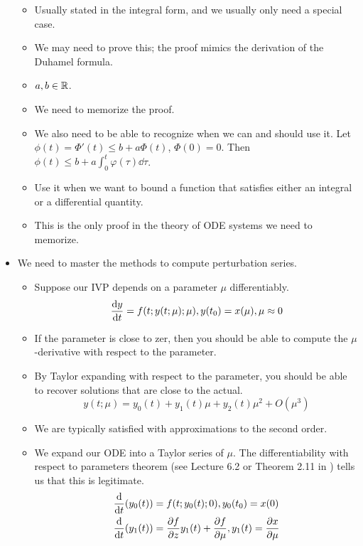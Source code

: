\documentclass[../notes.tex]{subfiles}
\begin{document}
\begin{itemize}
\begin{itemize}
        \item Usually stated in the integral form, and we usually only need a special case.
        \item We may need to prove this; the proof mimics the derivation of the Duhamel formula.
        \item $a,b\in\mathbb{R}$.
        \item We need to memorize the proof.
        \item We also need to be able to recognize when we can and should use it. Let $\phi(t)=\Phi'(t)\leq b+a\Phi(t)$, $\Phi(0)=0$. Then $\phi(t) \leq b+a\int_0^t\varphi(\tau)\dd\tau$.
        \item Use it when we want to bound a function that satisfies either an integral or a differential quantity.
        \item This is the only proof in the theory of ODE systems we need to memorize.
    \end{itemize}
    \item We need to master the methods to compute perturbation series.
    \begin{itemize}
        \item Suppose our IVP depends on a parameter $\mu$ differentiably.
        \begin{equation*}
            \dv{y}{t}(t;\mu) = f(t;y(t;\mu);\mu), y(t_0)=x(\mu),\mu\approx 0
        \end{equation*}
        \item If the parameter is close to zer, then you should be able to compute the $\mu$-derivative with respect to the parameter.
        \item By Taylor expanding with respect to the parameter, you should be able to recover solutions that are close to the actual.
        \begin{equation*}
            y(t;\mu) = y_0(t)+y_1(t)\mu+y_2(t)\mu^2+O(\mu^3)
        \end{equation*}
        \item We are typically satisfied with approximations to the second order.
        \item We expand our ODE into a Taylor series of $\mu$. The differentiability with respect to parameters theorem (see Lecture 6.2 or Theorem 2.11 in \textcite{bib:Teschl}) tells us that this is legitimate.
        \begin{align*}
            \dv{t}(y_0(t)) &= f(t;y_0(t);0), y_0(t_0)=x(0)\\
            \dv{t}(y_1(t)) &= \pdv{f}{z}(t;y_0(t);0)y_1(t)+\pdv{f}{\mu}(t;y_0(t);0), y_1(t)=\pdv{x}{\mu}(0)

\end{align*}
\end{itemize}
\end{itemize}
\end{document}
